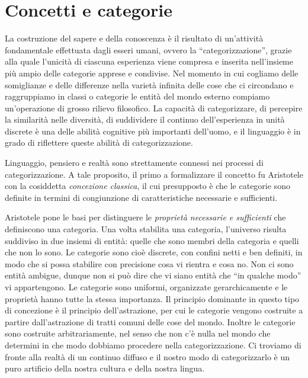 \chapter{Concetti e categorie}
La costruzione del sapere e della conoscenza è il risultato di un’attività fondamentale effettuata dagli esseri umani, ovvero la ``categorizzazione'', grazie alla quale l’unicità di ciascuna esperienza viene compresa e inserita nell’insieme più ampio delle categorie apprese e condivise. Nel momento in cui cogliamo delle somiglianze e delle differenze nella varietà infinita delle cose che ci circondano e raggruppiamo in classi o categorie le entità del mondo esterno compiamo un’operazione di grosso rilievo filosofico. La capacità di categorizzare, di percepire la similarità nelle diversità, di suddividere il continuo dell’esperienza in unità discrete è una delle abilità cognitive più importanti dell’uomo, e il linguaggio è in grado di riflettere queste abilità di categorizzazione.

Linguaggio, pensiero e realtà sono strettamente connessi nei processi di categorizzazione. A tale proposito, il primo a formalizzare il concetto fu Aristotele con la cosiddetta \emph{concezione classica}, il cui presupposto è che le categorie sono definite in termini di congiunzione di caratteristiche necessarie e sufficienti.

Aristotele pone le basi per distinguere le \emph{proprietà necessarie e sufficienti} che definiscono una categoria. Una volta stabilita una categoria, l’universo risulta suddiviso in due insiemi di entità: quelle che sono membri della categoria e quelli che non lo sono. Le categorie sono cioè discrete, con confini netti e ben definiti, in modo che si possa stabilire con precisione cosa vi rientra e cosa no. Non ci sono entità ambigue, dunque non si può dire che vi siano entità che ``in qualche modo'' vi appartengono. Le categorie sono uniformi, organizzate gerarchicamente e le proprietà hanno tutte la stessa importanza. Il principio dominante in questo tipo di concezione è il principio dell’astrazione, per cui le categorie vengono costruite a partire dall’astrazione di tratti comuni delle cose del mondo. Inoltre le categorie sono costruite arbitrariamente, nel senso che non c’è nulla nel mondo che determini in che modo dobbiamo procedere nella categorizzazione. Ci troviamo di fronte alla realtà di un continuo diffuso e il nostro modo di categorizzarlo è un puro artificio della nostra cultura e della nostra lingua.

